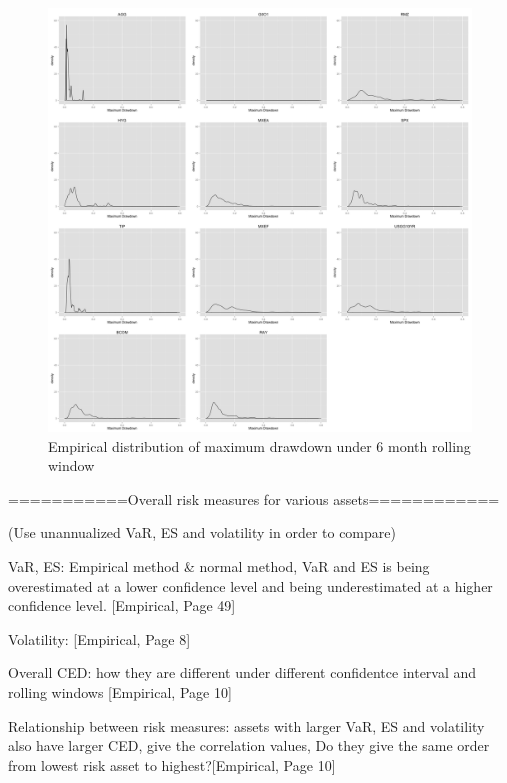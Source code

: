 \documentclass[11pt]{article}
\begin{document}
\begin{figure}[H]
\centering
\includegraphics[width=15cm]{../results/maxdd_dist_mon6}
\caption{Empirical distribution of maximum drawdown under 6 month rolling window} 
\label{fig: dist_mdd}
\end{figure}



\newpage









\clearpage


===========Overall risk measures for various assets============

(Use unannualized VaR, ES and volatility in order to compare)

VaR, ES: Empirical method \& normal method, VaR and ES is being overestimated at a lower confidence level and being underestimated at a higher confidence level. [Empirical, Page 49]

Volatility: [Empirical, Page 8]

Overall CED: how they are different under different confidentce interval and rolling windows [Empirical, Page 10]

Relationship between risk measures: assets with larger VaR, ES and volatility also have larger CED, give the correlation values, Do they give the same order from lowest risk asset to highest?[Empirical, Page 10]
\end{document}
